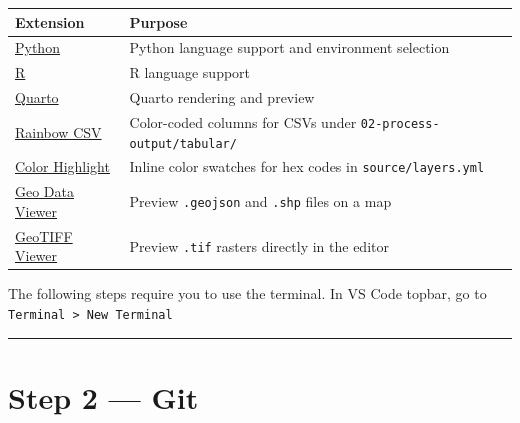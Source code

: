 \documentclass[
  letterpaper,
  DIV=11,
  numbers=noendperiod]{scrreprt}
\newcounter{none} %
\begin{document}
{\def\LTcaptype{none} %
\begin{longtable}[]{@{}
  >{\raggedright\arraybackslash}p{}
  >{\raggedright\arraybackslash}p{}@{}}
\toprule\noalign{}
\begin{minipage}[b]{\linewidth}\raggedright
Extension
\end{minipage} & \begin{minipage}[b]{\linewidth}\raggedright
Purpose
\end{minipage} \\
\midrule\noalign{}
\endhead
\bottomrule\noalign{}
\endlastfoot
\href{https://marketplace.visualstudio.com/items?itemName=ms-python.python}{Python}
& Python language support and environment selection \\
\href{https://marketplace.visualstudio.com/items?itemName=REditorSupport.r}{R}
& R language support \\
\href{https://marketplace.visualstudio.com/items?itemName=quarto.quarto}{Quarto}
& Quarto rendering and preview \\
\href{https://marketplace.visualstudio.com/items?itemName=mechatroner.rainbow-csv}{Rainbow
CSV} & Color-coded columns for CSVs under
\texttt{02-process-output/tabular/} \\
\href{https://marketplace.visualstudio.com/items?itemName=naumovs.color-highlight}{Color
Highlight} & Inline color swatches for hex codes in
\texttt{source/layers.yml} \\
\href{https://marketplace.visualstudio.com/items?itemName=RandomFractalsInc.geo-data-viewer}{Geo
Data Viewer} & Preview \texttt{.geojson} and \texttt{.shp} files on a
map \\
\href{https://marketplace.visualstudio.com/items?itemName=omar2535.geotiff-viewer}{GeoTIFF
Viewer} & Preview \texttt{.tif} rasters directly in the editor \\
\end{longtable}
}

The following steps require you to use the terminal. In VS Code topbar,
go to \texttt{Terminal\ \textgreater{}\ New\ Terminal}

\begin{center}\rule{0.5\linewidth}{0.5pt}\end{center}

\section{Step 2 --- Git}\label{step-2-git}
\end{document}
